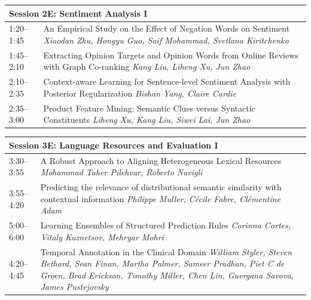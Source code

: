 \documentclass{book}
\renewcommand{\large}{\fontsize{36}{40}\selectfont}
\begin{document}
\begin{tabular}{p{3in}p{16in}}
  \multicolumn{2}{l}{\bfseries\large Session 2E: Sentiment Analysis I} \\\hline

    
    1:20--1:45
    &	An Empirical Study on the Effect of Negation Words on Sentiment \newline 
    {\itshape Xiaodan Zhu, Hongyu Guo, Saif Mohammad, Svetlana Kiritchenko} \\
    
    1:45--2:10
    &	Extracting Opinion Targets and Opinion Words from Online Reviews with Graph Co-ranking \newline 
    {\itshape Kang Liu, Liheng Xu, Jun Zhao} \\
    
    2:10--2:35
    &	Context-aware Learning for Sentence-level Sentiment Analysis with Posterior Regularization \newline 
    {\itshape Bishan Yang, Claire Cardie} \\
    
    2:35--3:00
    &	Product Feature Mining: Semantic Clues versus Syntactic Constituents \newline 
    {\itshape Liheng Xu, Kang Liu, Siwei Lai, Jun Zhao} \\
    
\end{tabular}

\begin{tabular}{p{3in}p{16in}}
  \multicolumn{2}{l}{\bfseries\large Session 3E: Language Resources and Evaluation I} \\\hline

    
    3:30--3:55
    &	A Robust Approach to Aligning Heterogeneous Lexical Resources \newline 
    {\itshape Mohammad Taher Pilehvar, Roberto Navigli} \\
    
    3:55--4:20
    &	Predicting the relevance of distributional semantic similarity with contextual information \newline 
    {\itshape Philippe Muller, Cécile Fabre, Clémentine Adam} \\
    
    5:00--6:00
    &	Learning Ensembles of Structured Prediction Rules \newline 
    {\itshape Corinna Cortes, Vitaly Kuznetsov, Mehryar Mohri} \\
    
    4:20--4:45
    &	Temporal Annotation in the Clinical Domain \newline 
    {\itshape William Styler, Steven Bethard, Sean Finan, Martha Palmer, Sameer Pradhan, Piet C de Groen, Brad Erickson, Timothy Miller, Chen Lin, Guergana Savova, James Pustejovsky} \\
    
\end{tabular}
\end{document}
